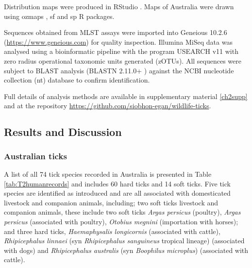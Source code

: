 \documentclass[a4paper, nobind]{templates/ociamthesis}
\begin{document}
Distribution maps were produced in RStudio \autocite{rstudioteamRStudioIntegratedDevelopment2015}.
Maps of Australia were drawn using ozmaps \autocite{SumnerOzmaps2021}, sf \autocite{PebesmaRsf2018} and sp \autocite{BivandRsp2013} R packages.

Sequences obtained from MLST assays were imported into Geneious 10.2.6 (\url{https://www.geneious.com}) for quality inspection.
Illumina MiSeq data was analysed using a bioinformatic pipeline with the program USEARCH v11 \autocite{edgarSearchClusteringOrders2010} with zero radius operational taxonomic units generated (zOTUs).
All sequences were subject to BLAST analysis (BLASTN 2.11.0+ \autocite{zhangGreedyAlgorithmAligning2000,morgulisDatabaseIndexingProduction2008}) against the NCBI nucleotide collection (nt) database to confirm identification.

Full details of analysis methods are available in supplementary material \ref{ch2supp} and at the repository \url{https://github.com/siobhon-egan/wildlife-ticks}.

\hypertarget{results-and-discussion}{%
\subsection{Results and Discussion}\label{results-and-discussion}}

\hypertarget{australian-ticks}{%
\subsubsection{Australian ticks}\label{australian-ticks}}

A list of all 74 tick species recorded in Australia is presented in Table \ref{tab:T2humanrecords} and includes 60 hard ticks and 14 soft ticks.
Five tick species are identified as introduced and are all associated with domesticated livestock and companion animals, including; two soft ticks
livestock and companion animals, these include two soft ticks \emph{Argas persicus} (poultry), \emph{Argas persicus} (associated with poultry), \emph{Otobius megnini} (importation with horses); and three hard ticks, \emph{Haemaphysalis longicornis} (associated with cattle), \emph{Rhipicephalus linnaei} (syn \emph{Rhipicephalus sanguineus} tropical lineage) (associated with dogs) and \emph{Rhipicephalus australis} (syn \emph{Boophilus microplus}) (associated with cattle).
\end{document}
